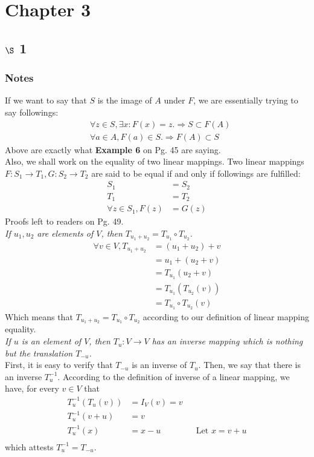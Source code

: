 \documentclass[11pt]{article}
\begin{document}
\section{Chapter 3}
\label{sec:org342073d}
\subsection{\(\S\) 1}
\label{sec:org5cb87bc}
\subsubsection{Notes}
\label{sec:orge622811}
If we want to say that \(S\) is the image of \(A\) under \(F\), we are essentially trying to say followings:
$$\begin{aligned}
&\forall z\in S, \exists x:F(x)=z. \Rightarrow S\subset F(A)\\
&\forall a\in A, F(a)\in S. \Rightarrow F(A)\subset S
\end{aligned}$$
Above are exactly what \textbf{Example 6} on Pg. 45 are saying.\\
Also, we shall work on the equality of two linear mappings. Two linear mappings \(F:S_1\rightarrow T_1 ,G:S_2\rightarrow T_2\) are said to be equal if and only if followings are fulfilled:
$$\begin{aligned}
S_1&=S_2\\
T_1&=T_2\\
\forall z\in S_1, F(z)&=G(z)
\end{aligned}$$
Proofs left to readers on Pg. 49.\\
 \emph{If \(u_1,u_2\) are elements of \(V\), then \(T_{u_1+u_2}=T_{u_1}\circ T_{u_2}\).}\\
$$\begin{aligned}
\forall v\in V, T_{u_1+u_2}&=(u_1+u_2)+v\\
&=u_1+(u_2+v)\\
&=T_{u_1}(u_2+v)\\
&=T_{u_1}(T_{u_2}(v))\\
&=T_{u_1}\circ T_{u_2}(v)
\end{aligned}$$
Which means that \(T_{u_1+u_2}=T_{u_1}\circ T_{u_2}\) according to our definition of linear mapping equality.\\
\emph{If \(u\) is an element of \(V\), then \(T_u:V\rightarrow V\) has an inverse mapping which is nothing but the translation \(T_{-u}\).}\\
First, it is easy to verify that \(T_{-u}\) is an inverse of \(T_u\). Then, we say that there is an inverse \(T_u^{-1}\). According to the definition of inverse of a linear mapping, we have, for every \(v\in V\) that
$$\begin{aligned}
T_u^{-1}(T_u(v))&=I_V(v)=v\\
T_u^{-1}(v+u)&=v\\
T_u^{-1}(x)&=x-u && \text{Let } x=v+u\\
\end{aligned}$$
which attests \(T_{u}^{-1}=T_{-u}\).
\end{document}
